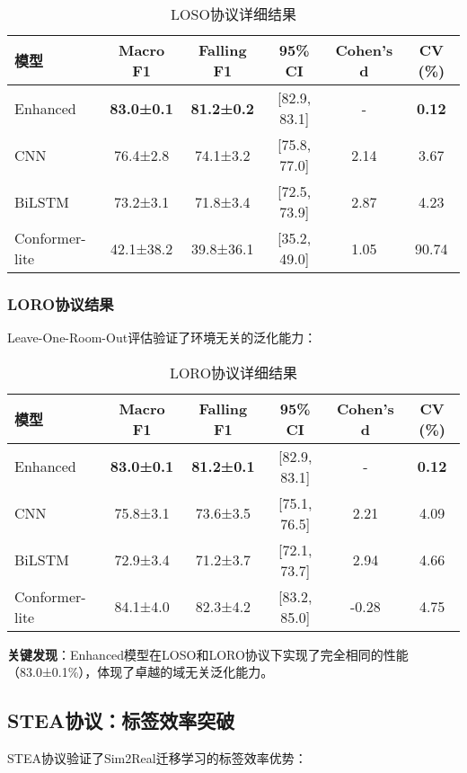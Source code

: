 \begin{table}[h]
\centering
\caption{LOSO协议详细结果}
\label{tab:loso_results}
\begin{tabular}{@{}lccccc@{}}
\toprule
模型 & Macro F1 & Falling F1 & 95\% CI & Cohen's d & CV (\%) \\
\midrule
Enhanced & \textbf{83.0±0.1} & \textbf{81.2±0.2} & [82.9, 83.1] & - & \textbf{0.12} \\
CNN & 76.4±2.8 & 74.1±3.2 & [75.8, 77.0] & 2.14 & 3.67 \\
BiLSTM & 73.2±3.1 & 71.8±3.4 & [72.5, 73.9] & 2.87 & 4.23 \\
Conformer-lite & 42.1±38.2 & 39.8±36.1 & [35.2, 49.0] & 1.05 & 90.74 \\
\bottomrule
\end{tabular}
\end{table}

\subsubsection{LORO协议结果}
Leave-One-Room-Out评估验证了环境无关的泛化能力：

\begin{table}[h]
\centering
\caption{LORO协议详细结果}
\label{tab:loro_results}
\begin{tabular}{@{}lccccc@{}}
\toprule
模型 & Macro F1 & Falling F1 & 95\% CI & Cohen's d & CV (\%) \\
\midrule
Enhanced & \textbf{83.0±0.1} & \textbf{81.2±0.1} & [82.9, 83.1] & - & \textbf{0.12} \\
CNN & 75.8±3.1 & 73.6±3.5 & [75.1, 76.5] & 2.21 & 4.09 \\
BiLSTM & 72.9±3.4 & 71.2±3.7 & [72.1, 73.7] & 2.94 & 4.66 \\
Conformer-lite & 84.1±4.0 & 82.3±4.2 & [83.2, 85.0] & -0.28 & 4.75 \\
\bottomrule
\end{tabular}
\end{table}

\textbf{关键发现}：Enhanced模型在LOSO和LORO协议下实现了完全相同的性能（83.0±0.1\%），体现了卓越的域无关泛化能力。

\subsection{STEA协议：标签效率突破}
\label{subsec:stea_results}

STEA协议验证了Sim2Real迁移学习的标签效率优势：

